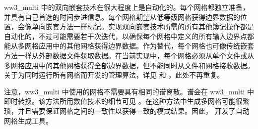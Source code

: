\vspace{\baselineskip} 
\noindent 
{\file ww3\_multi} 中的双向嵌套技术在很大程度上是自动化的。每个网格都独立准备，并具有自己首选的时间步进信息。每个网格期望从低等级网格获得边界数据的位置，会像单向嵌套方法一样标记。实现双向嵌套技术所需的所有其他簿记操作都是自动化的，不过可能需要若干次迭代，以确保每个网格中定义的所有输入边界点都能从多网格应用中的其他网格获得边界数据。作为替代，每个网格也可像传统嵌套方法一样从外部数据文件获取数据。在当前实现中，每个网格必须从单个文件或从多网格应用中的其他网格获得全部边界数据，但不能同时从文件和网格接收数据。关于为同时运行所有网格而开发的管理算法，详见 \citet[section 3.4]{tol:MMAB07b} 和 \cite{tol:OMOD08b}，此处不再重复。

注意，{\file ww3\_multi} 中使用的网格不需要具有相同的谱离散。谱会在 {\file
ww3\_multi} 中即时转换。该方法所用数值技术的细节可见 \citet[section 3.5.5]{tol:MMAB07b}。在这种方法中生成多网格可能很繁琐，并且需要保证网格之间的一致性以获得一致的模式结果。因此，\cite{tol:MMAB07a, tol:OMOD08a} 开发了自动网格生成工具。
